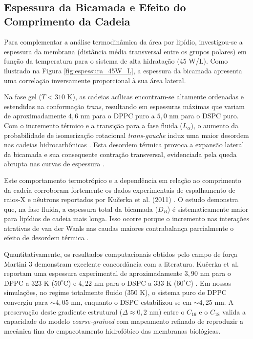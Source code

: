 \documentclass[12pt]{article} %
\begin{document}
\

\subsection{Espessura da Bicamada e Efeito do Comprimento da Cadeia}

Para complementar a análise termodinâmica da área por lipídio, investigou-se a espessura da membrana (distância média transversal entre os grupos polares) em função da temperatura para o sistema de alta hidratação (45 W/L). Como ilustrado na Figura \ref{fig:espessura_45W_L}, a espessura da bicamada apresenta uma correlação inversamente proporcional à sua área lateral. 

Na fase gel ($T < 310$ K), as cadeias acílicas encontram-se altamente ordenadas e estendidas na conformação \textit{trans}, resultando em espessuras máximas que variam de aproximadamente $4,6$ nm para o DPPC puro a $5,0$ nm para o DSPC puro. Com o incremento térmico e a transição para a fase fluida ($L_\alpha$), o aumento da probabilidade de isomerização rotacional \textit{trans-gauche} induz uma maior desordem nas cadeias hidrocarbônicas \cite{kucerka2011}. Esta desordem térmica provoca a expansão lateral da bicamada e sua consequente contração transversal, evidenciada pela queda abrupta nas curvas de espessura \cite{kucerka2011}.

Este comportamento termotrópico e a dependência em relação ao comprimento da cadeia corroboram fortemente os dados experimentais de espalhamento de raios-X e nêutrons reportados por Ku\v{c}erka et al. (2011) \cite{kucerka2011}. O estudo demonstra que, na fase fluida, a espessura total da bicamada ($D_B$) é sistematicamente maior para lipídios de cadeia mais longa. Isso ocorre porque o incremento nas interações atrativas de van der Waals nas caudas maiores contrabalança parcialmente o efeito de desordem térmica \cite{kucerka2011}.

Quantitativamente, os resultados computacionais obtidos pelo campo de força Martini 3 demonstram excelente concordância com a literatura. Ku\v{c}erka et al. reportam uma espessura experimental de aproximadamente $3,90$ nm para o DPPC a 323 K ($50^\circ$C) e $4,22$ nm para o DSPC a 333 K ($60^\circ$C) \cite{kucerka2011}. Em nossas simulações, no regime totalmente fluido (350 K), o sistema puro de DPPC convergiu para $\sim 4,05$ nm, enquanto o DSPC estabilizou-se em $\sim 4,25$ nm. A preservação deste gradiente estrutural ($\Delta \approx 0,2$ nm) entre o $C_{16}$ e o $C_{18}$ valida a capacidade do modelo \textit{coarse-grained} com mapeamento refinado de reproduzir a mecânica fina do empacotamento hidrofóbico das membranas biológicas.
\end{document}
